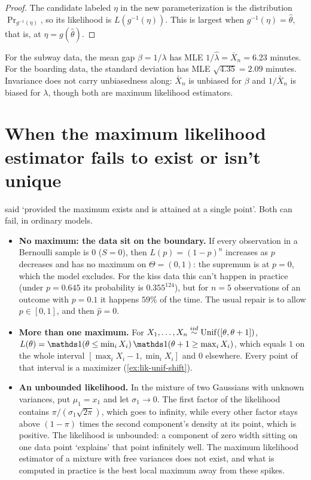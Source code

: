 \begin{proof}
The candidate labeled $\eta$ in the new parameterization is the distribution $\Pr_{g^{-1}(\eta)}$, so its likelihood is $L(g^{-1}(\eta))$.
This is largest when $g^{-1}(\eta) = \hat{\theta}$, that is, at $\eta = g(\hat{\theta})$.
\end{proof}

For the subway data, the mean gap $\beta = 1/\lambda$ has MLE $1/\hat{\lambda} = \bar{X}_n = 6.23$ minutes.
For the boarding data, the standard deviation has MLE $\sqrt{4.35} = 2.09$ minutes.
Invariance does not carry unbiasedness along: $\bar{X}_n$ is unbiased for $\beta$ and $1/\bar{X}_n$ is biased for $\lambda$, though both are maximum likelihood estimators.

\section{When the maximum likelihood estimator fails to exist or isn't unique}
\label{sec:lik-fail}

 said `provided the maximum exists and is attained at a single point'. Both can fail, in ordinary models.

\begin{pitfall}
\begin{itemize}
\item \textbf{No maximum: the data sit on the boundary.} If every observation in a Bernoulli sample is $0$ ($S = 0$), then $L(p) = (1 - p)^n$ increases as $p$ decreases and has no maximum on $\Theta = (0, 1)$: the supremum is at $p = 0$, which the model excludes. For the kiss data this can't happen in practice (under $p = 0.645$ its probability is $0.355^{124}$), but for $n = 5$ observations of an outcome with $p = 0.1$ it happens $59\%$ of the time. The usual repair is to allow $p \in [0, 1]$, and then $\hat{p} = 0$.
\item \textbf{More than one maximum.} For $X_1, \ldots, X_n \stackrel{iid}{\sim} \mathrm{Unif}([\theta, \theta + 1])$, $L(\theta) = \ind(\theta \leq \min_i X_i)\,\ind(\theta + 1 \geq \max_i X_i)$, which equals $1$ on the whole interval $[\max_i X_i - 1, \min_i X_i]$ and $0$ elsewhere. Every point of that interval is a maximizer (\cref{ex:lik-unif-shift}).
\item \textbf{An unbounded likelihood.} In the mixture of two Gaussians with unknown variances, put $\mu_1 = x_1$ and let $\sigma_1 \to 0$. The first factor of the likelihood contains $\pi/(\sigma_1\sqrt{2\pi})$, which goes to infinity, while every other factor stays above $(1 - \pi)$ times the second component's density at its point, which is positive. The likelihood is unbounded: a component of zero width sitting on one data point `explains' that point infinitely well. The maximum likelihood estimator of a mixture with free variances does not exist, and what is computed in practice is the best local maximum away from these spikes.
\end{itemize}
\end{pitfall}

